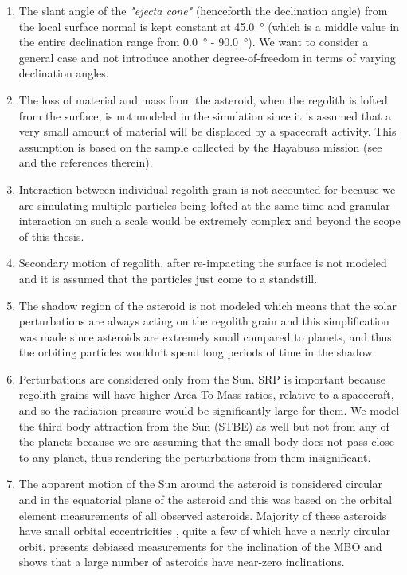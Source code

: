 \begin{enumerate}
\item The slant angle of the \textit{"ejecta cone"} (henceforth the declination angle) from the local surface normal is kept constant at \SI{45.0}{\degree} (which is a middle value in the entire declination range from \SI{0.0}{\degree} - \SI{90.0}{\degree}). We want to consider a general case and not introduce another degree-of-freedom in terms of varying declination angles.

\item The loss of material and mass from the asteroid, when the regolith is lofted from the surface, is not modeled in the simulation since it is assumed that a very small amount of material will be displaced by a spacecraft activity. This assumption is based on the sample collected by the Hayabusa mission (see  and the references therein).

\item Interaction between individual regolith grain is not accounted for because we are simulating multiple particles being lofted at the same time and granular interaction on such a scale would be extremely complex and beyond the scope of this thesis.

\item Secondary motion of regolith, after re-impacting the surface is not modeled and it is assumed that the particles just come to a standstill.

\item The shadow region of the asteroid is not modeled which means that the solar perturbations are always acting on the regolith grain and this simplification was made since asteroids are extremely small compared to planets, and thus the orbiting particles wouldn't spend long periods of time in the shadow.

\item Perturbations are considered only from the Sun. \gls{SRP} is important because regolith grains will have higher Area-To-Mass ratios, relative to a spacecraft, and so the radiation pressure would be significantly large for them. We model the third body attraction from the Sun (\gls{STBE}) as well but not from any of the planets because we are assuming that the small body does not pass close to any planet, thus rendering the perturbations from them insignificant.

\item The apparent motion of the Sun around the asteroid is considered circular and in the equatorial plane of the asteroid and this was based on the orbital element measurements of all observed asteroids. Majority of these asteroids have small orbital eccentricities \parencite{malhotra2016_eccentricityDistribution}, quite a few of which have a nearly circular orbit. \cite{jedicke1998_orbitalElements} presents debiased measurements for the inclination of the \gls{MBO} and shows that a large number of asteroids have near-zero inclinations.
\end{enumerate}
\newpage
